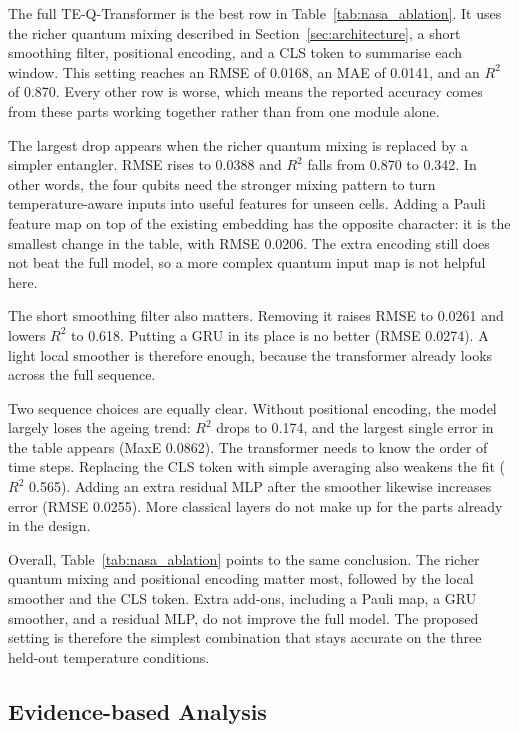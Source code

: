 \documentclass[a4paper,fleqn]{cas-sc}
\begin{document}
The full TE-Q-Transformer is the best row in Table~\ref{tab:nasa_ablation}. It uses the richer quantum mixing described in Section~\ref{sec:architecture}, a short smoothing filter, positional encoding, and a CLS token to summarise each window. This setting reaches an RMSE of 0.0168, an MAE of 0.0141, and an $R^2$ of 0.870. Every other row is worse, which means the reported accuracy comes from these parts working together rather than from one module alone.

The largest drop appears when the richer quantum mixing is replaced by a simpler entangler. RMSE rises to 0.0388 and $R^2$ falls from 0.870 to 0.342. In other words, the four qubits need the stronger mixing pattern to turn temperature-aware inputs into useful features for unseen cells. Adding a Pauli feature map on top of the existing embedding has the opposite character: it is the smallest change in the table, with RMSE 0.0206. The extra encoding still does not beat the full model, so a more complex quantum input map is not helpful here.

The short smoothing filter also matters. Removing it raises RMSE to 0.0261 and lowers $R^2$ to 0.618. Putting a GRU in its place is no better (RMSE 0.0274). A light local smoother is therefore enough, because the transformer already looks across the full sequence.

Two sequence choices are equally clear. Without positional encoding, the model largely loses the ageing trend: $R^2$ drops to 0.174, and the largest single error in the table appears (MaxE 0.0862). The transformer needs to know the order of time steps. Replacing the CLS token with simple averaging also weakens the fit ($R^2$ 0.565). Adding an extra residual MLP after the smoother likewise increases error (RMSE 0.0255). More classical layers do not make up for the parts already in the design.

Overall, Table~\ref{tab:nasa_ablation} points to the same conclusion. The richer quantum mixing and positional encoding matter most, followed by the local smoother and the CLS token. Extra add-ons, including a Pauli map, a GRU smoother, and a residual MLP, do not improve the full model. The proposed setting is therefore the simplest combination that stays accurate on the three held-out temperature conditions.

\subsection{Evidence-based Analysis}\label{sec:discussion}
\end{document}
